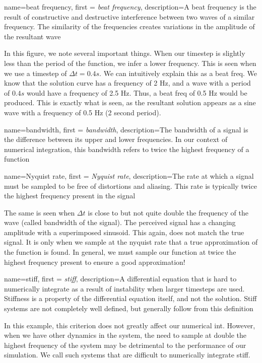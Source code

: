 \documentclass[12pt]{report}
\begin{document}
{
    name=beat frequency,
    first = {\textit{beat frequency}},
    description={A beat frequency is the result of constructive and destructive interference between two waves of a similar frequency. The similarity of the frequencies creates variations in the amplitude of the resultant wave}
}

In this figure, we note several important things. When our timestep is slightly less than the period of the function, we infer a lower frequency. This is seen when we use a timestep of $\Delta t=0.4s$. We can intuitively explain this as a \gls{beat freq}. We know that the solution curve has a frequency of 2 Hz, and a wave with a period of $0.4 s$ would have a frequency of 2.5 Hz. Thus, a \gls{beat freq} of 0.5 Hz would be produced. This is exactly what is seen, as the resultant solution appears as a sine wave with a frequency of 0.5 Hz (2 second period). 

{
    name=bandwidth,
    first = {\textit{bandwidth}},
    description={The bandwidth of a signal is the difference between its upper and lower frequencies. In our context of numerical integration, this bandwidth refers to twice the highest frequency of a function}
}

{
    name=Nyquist rate,
    first = {\textit{Nyquist rate}},
    description={The rate at which a signal must be sampled to be free of distortions and aliasing. This rate is typically twice the highest frequency present in the signal}
}

The same is seen when $\Delta t$ is close to but not quite double the frequency of the wave (called \gls{bandwidth} of the signal). The perceived signal has a changing amplitude with a superimposed sinusoid. This again, does not match the true signal. It is only when we sample at the \gls{nyquist rate} that a true approximation of the function is found. In general, we must sample our function at twice the highest frequency present to ensure a good approximation!

{
    name=stiff,
    first = {\textit{stiff}},
    description={A differential equation that is hard to numerically integrate as a result of instability when larger timesteps are used. Stiffness is a property of the differential equation itself, and not the solution. Stiff systems are not completely well defined, but generally follow from this definition}
}

In this example, this criterion does not greatly affect our \gls{numerical int}. However, when we have other dynamics in the system, the need to sample at double the highest frequency of the system may be detrimental to the performance of our simulation. We call such systems that are difficult to numerically integrate \gls{stiff}. 
\end{document}
